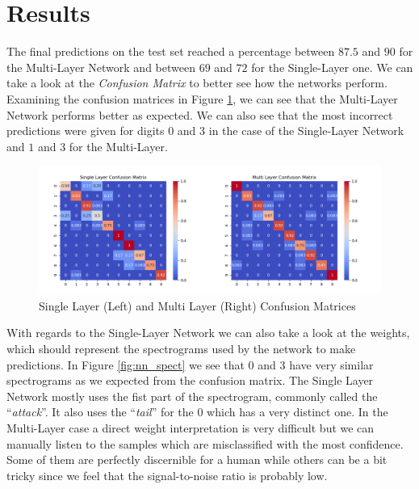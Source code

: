 \documentclass[10pt,a4paper]{report}
\begin{document}
\section{Results}
The final predictions on the test set reached a percentage between $87.5$ and $90$ for the Multi-Layer Network and between $69$ and $72$ for the Single-Layer one. We can take a look at the \textit{Confusion Matrix} to better see how the networks perform. Examining the confusion matrices in Figure \ref{fig:conf_mat}, we can see that the Multi-Layer Network performs better as expected. We can also see that the most incorrect predictions were given for digits $0$ and $3$ in the case of the Single-Layer Network and $1$ and $3$ for the Multi-Layer. 
\begin{figure}[H]
\centering
\includegraphics[width=0.8\linewidth]{conf_mat.png}
\caption{Single Layer (Left) and Multi Layer (Right) Confusion Matrices}
\label{fig:conf_mat}
\end{figure}
With regards to the Single-Layer Network we can also take a look at the weights, which should represent the spectrograms used by the network to make predictions. In Figure \ref{fig:nn_spect} we see that $0$ and $3$ have very similar spectrograms as we expected from the confusion matrix. The Single Layer Network mostly uses the fist part of the spectrogram, commonly called the \enquote{\textit{attack}}. It also uses the \enquote{\textit{tail}} for the $0$ which has a very distinct one. In the Multi-Layer case a direct weight interpretation is very difficult but we can manually listen to the samples which are misclassified with the most confidence. Some of them are perfectly discernible for a human while others can be a bit tricky since we feel that the signal-to-noise ratio is probably low.
\end{document}
